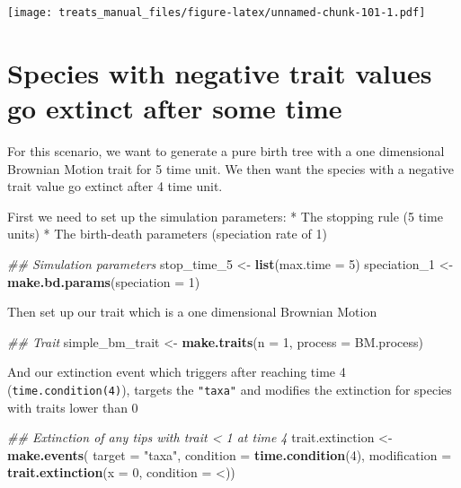 \documentclass[
]{book}
\newenvironment{Shaded}{\begin{snugshade}}{\end{snugshade}}
\newcommand{\CommentTok}[1]{\textcolor[rgb]{0.56,0.35,0.01}{\textit{#1}}}
\newcommand{\DataTypeTok}[1]{\textcolor[rgb]{0.13,0.29,0.53}{#1}}
\newcommand{\DecValTok}[1]{\textcolor[rgb]{0.00,0.00,0.81}{#1}}
\newcommand{\KeywordTok}[1]{\textcolor[rgb]{0.13,0.29,0.53}{\textbf{#1}}}
\newcommand{\NormalTok}[1]{#1}
\newcommand{\StringTok}[1]{\textcolor[rgb]{0.31,0.60,0.02}{#1}}
\begin{document}
\texttt{[image: treats\_manual\_files/figure-latex/unnamed-chunk-101-1.pdf]}

\hypertarget{EGneg_ext}{%
\section{Species with negative trait values go extinct after some time}\label{EGneg_ext}}

For this scenario, we want to generate a pure birth tree with a one dimensional Brownian Motion trait for 5 time unit.
We then want the species with a negative trait value go extinct after 4 time unit.

First we need to set up the simulation parameters:
* The stopping rule (5 time units)
* The birth-death parameters (speciation rate of 1)

\begin{Shaded}
\begin{Highlighting}[]
\CommentTok{\#\# Simulation parameters}
\NormalTok{stop\_time\_}\DecValTok{5}\NormalTok{ \textless{}{-}}\StringTok{ }\KeywordTok{list}\NormalTok{(}\DataTypeTok{max.time =} \DecValTok{5}\NormalTok{)}
\NormalTok{speciation\_}\DecValTok{1}\NormalTok{ \textless{}{-}}\StringTok{ }\KeywordTok{make.bd.params}\NormalTok{(}\DataTypeTok{speciation =} \DecValTok{1}\NormalTok{)}
\end{Highlighting}
\end{Shaded}

Then set up our trait which is a one dimensional Brownian Motion

\begin{Shaded}
\begin{Highlighting}[]
\CommentTok{\#\# Trait}
\NormalTok{simple\_bm\_trait \textless{}{-}}\StringTok{ }\KeywordTok{make.traits}\NormalTok{(}\DataTypeTok{n =} \DecValTok{1}\NormalTok{, }\DataTypeTok{process =}\NormalTok{ BM.process)}
\end{Highlighting}
\end{Shaded}

And our extinction event which triggers after reaching time 4 (\texttt{time.condition(4)}), targets the \texttt{"taxa"} and modifies the extinction for species with traits lower than 0

\begin{Shaded}
\begin{Highlighting}[]
\CommentTok{\#\# Extinction of any tips with trait \textless{} 1 at time 4}
\NormalTok{trait.extinction \textless{}{-}}\StringTok{ }\KeywordTok{make.events}\NormalTok{(}
                      \DataTypeTok{target =} \StringTok{"taxa"}\NormalTok{,}
                      \DataTypeTok{condition =} \KeywordTok{time.condition}\NormalTok{(}\DecValTok{4}\NormalTok{),}
                      \DataTypeTok{modification =} \KeywordTok{trait.extinction}\NormalTok{(}\DataTypeTok{x =} \DecValTok{0}\NormalTok{,}
                                                      \DataTypeTok{condition =} \StringTok{\textasciigrave{}}\DataTypeTok{\textless{}}\StringTok{\textasciigrave{}}\NormalTok{))}
\end{Highlighting}
\end{Shaded}
\end{document}
